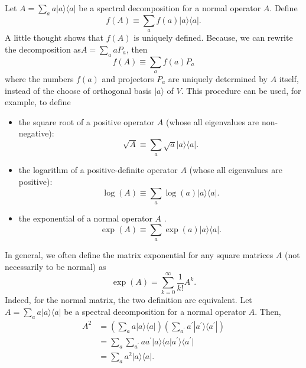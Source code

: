 Let $A=\sum_{a} a|a\rangle\langle a|$ be a spectral decomposition for a normal operator $A$. Define 
\begin{equation}
    f(A) \equiv \sum_{a} f(a)|a\rangle\langle a|.
\end{equation}
A little thought shows that $f(A)$ is uniquely defined. Because, we can rewrite the decomposition as$A=\sum_{a} a P_{a}$, then 
\begin{equation}
    f(A) \equiv \sum_{a} f(a) P_{a}
\end{equation}
where the numbers $f(a)$ and projectors $P_{a}$ are uniquely determined by $A$ itself, instead of the choose of orthogonal basis $|a\rangle$ of $V.$ This procedure can be used, for example, to define 
\begin{itemize}
    \item the square root of a positive operator $A$ (whose all eigenvalues are non-negative):
\begin{equation}
    \sqrt{A} \equiv \sum_{a} \sqrt{a} |a\rangle\langle a|.
\end{equation}
    \item the logarithm of a positive-definite operator $A$ (whose all eigenvalues are positive):
\begin{equation}
    \log (A) \equiv \sum_{a} \log (a)|a\rangle\langle a|.
\end{equation}
    \item the exponential of a normal operator $A$ . 
\begin{equation}
    \exp (A) \equiv \sum_{a} \exp (a)|a\rangle\langle a|.
\end{equation}
\end{itemize}
In general, we often define the matrix exponential for any square matrices $A$ (not necessarily to be normal) as
\begin{equation}
    \exp (A) =\sum_{k=0}^{\infty} \frac{1}{k!} A^k.
\end{equation}
Indeed, for the normal matrix, the two definition are equivalent. Let $A=\sum_{a} a|a\rangle\langle a|$ be a spectral decomposition for a normal operator $A$. Then,
\begin{align}
    A^2
    &=\left(  \sum_{a} a|a\rangle\langle a| \right)\left(  \sum_{a^{\prime}} a^{\prime}|a^{\prime}\rangle\langle a^{\prime}| \right) \\
    &= \sum_{a}  \sum_{a^{\prime}}  a a^{\prime}|a\rangle\langle a|a^{\prime}\rangle\langle a^{\prime}| \\
    &=\sum_{a} a^2|a\rangle\langle a|.
\end{align}
